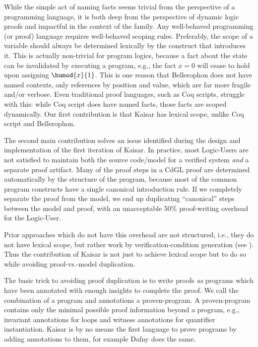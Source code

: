 \documentclass[12pt]{cmuthesis}
\theoremstyle{definition}
\theoremstyle{remark}
\newcommand{\rref}[2][]{\prettyref{#2}}
\newcommand{\CdGL}{\textsf{CdGL}\xspace}
\begin{document}
While the simple act of naming facts seems trivial from the perspective of a programming language, it is both deep from the perspective of dynamic logic proofs and impactful in the context of the \dL family.
Any well-behaved programming (or proof) language requires well-behaved scoping rules.
Preferably, the scope of a variable should always be determined lexically by the construct that introduces it.
This is actually non-trivial for program logics, because a fact about the state can be invalidated by executing a program, e.g., the fact $x=0$ will cease to hold upon assigning $\humod{x}{1}$.
This is one reason that Bellerophon does not have named contexts, only references by position and value, which are far more fragile and/or verbose.
Even traditional proof languages, such as Coq scripts, struggle with this: while Coq script does have named facts, those facts are scoped dynamically.
Our first contribution is that Kaisar has lexical scope, unlike Coq script and Bellerophon.

The second main contribution solves an issue identified during the design and implementation of the first iteration of Kaisar.
In practice, most Logic-Users are not satisfied to maintain both the source code/model for a verified system \emph{and} a separate proof artifact.
Many of the proof steps in a \CdGL proof are determined automatically by the structure of the program, because most of the common program constructs have a single canonical introduction rule.
If we completely separate the proof from the model, we end up duplicating ``canonical'' steps between the model and proof, with an unacceptable 50\% proof-writing overhead for the Logic-User.

Prior approaches which do not have this overhead are not structured, i.e., they do not have lexical scope, but rather work by verification-condition generation (see \rref{sec:sec:kaisar-relwork}).
Thus the contribution of Kaisar is not just to achieve lexical scope but to do so while avoiding proof-vs.-model duplication.

The basic trick to avoiding proof duplication is to write proofs \emph{as} programs which have been annotated with enough insights to complete the proof.
We call the combination of a program and annotations a proven-program.
A proven-program contains only the minimal possible proof information beyond a program, e.g., invariant annotations for loops and witness annotations for quantifier instantiation.
Kaisar is by no means the first language to prove programs by adding annotations to them, for example Dafny does the same.
\end{document}
